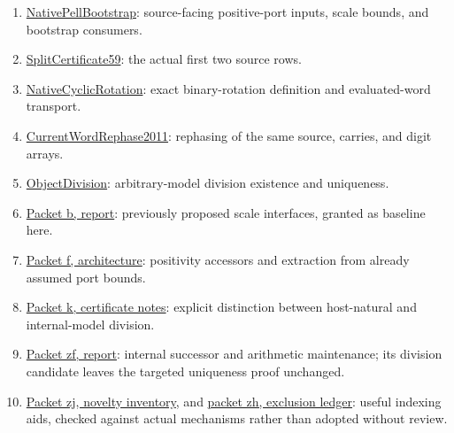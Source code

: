 \documentclass[11pt,letterpaper]{article}
\newcommand{\source}[2]{\href{https://github.com/VladimirReshetnikov/ProveIt/blob/f00ba53b331833c6cb64707bd90e48489e5610f5/#1}{#2}}
\begin{document}
\begin{enumerate}[label={\arabic*.}]
\item \source{Computability/DiophantineConsistency/Lean/DiophantineConsistency/NativePellBootstrap.lean}{NativePellBootstrap}: source-facing positive-port inputs, scale bounds, and bootstrap consumers.
\item \source{Computability/DiophantineConsistency/Lean/DiophantineConsistency/SplitCertificate59.lean}{SplitCertificate59}: the actual first two source rows.
\item \source{Computability/DiophantineConsistency/Lean/DiophantineConsistency/NativeCyclicRotation.lean}{NativeCyclicRotation}: exact binary-rotation definition and evaluated-word transport.
\item \source{Computability/DiophantineConsistency/Lean/DiophantineConsistency/CurrentWordRephase2011.lean}{CurrentWordRephase2011}: rephasing of the same source, carries, and digit arrays.
\item \source{Computability/DiophantineConsistency/Lean/DiophantineConsistency/ObjectDivision.lean}{ObjectDivision}: arbitrary-model division existence and uniqueness.
\item \source{Computability/DiophantineConsistency/research/lean-proof-simplification/2026-10-26b/report.tex}{Packet b, report}: previously proposed scale interfaces, granted as baseline here.
\item \source{Computability/DiophantineConsistency/research/lean-proof-simplification/2026-10-26f/report/sections/03_architecture.tex}{Packet f, architecture}: positivity accessors and extraction from already assumed port bounds.
\item \source{Computability/DiophantineConsistency/research/lean-proof-simplification/2026-10-26k/certificates/README.md}{Packet k, certificate notes}: explicit distinction between host-natural and internal-model division.
\item \source{Computability/DiophantineConsistency/research/lean-proof-simplification/2026-10-26zf/report.tex}{Packet zf, report}: internal successor and arithmetic maintenance; its division candidate leaves the targeted uniqueness proof unchanged.
\item \source{Computability/DiophantineConsistency/research/lean-proof-simplification/2026-10-26zj/evidence/novelty_inventory.md}{Packet zj, novelty inventory}, and \source{Computability/DiophantineConsistency/research/lean-proof-simplification/2026-10-26zh/catalog/EXCLUSION_AND_ADOPTION_LEDGER.md}{packet zh, exclusion ledger}: useful indexing aids, checked against actual mechanisms rather than adopted without review.
\end{enumerate}
\end{document}
